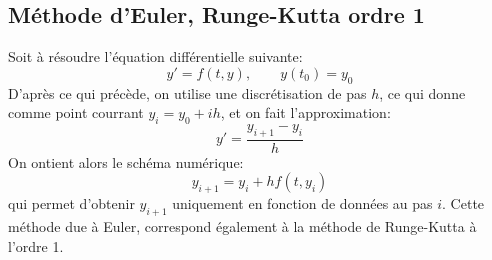 \subsection{Méthode d'Euler, Runge-Kutta ordre 1} Soit à résoudre l'équation différentielle suivante:
\begin{equation}
y' = f(t, y), \qquad y(t_0) = y_0
\end{equation}
D'après ce qui précède, on utilise une discrétisation de pas $h$, ce qui donne comme point courrant $y_i=y_0+ih$, et on fait l'approximation:
\begin{equation} 
y'=\frac{y_{i+1}-y_i}h
\end{equation}
On ontient alors le schéma numérique:
\begin{equation}
y_{i+1}=y_i+hf(t,y_i)
\end{equation}
qui permet d'obtenir $y_{i+1}$ uniquement en fonction de données au pas $i$. Cette méthode due à Euler, correspond également à la méthode de Runge-Kutta à l'ordre 1. 
 
